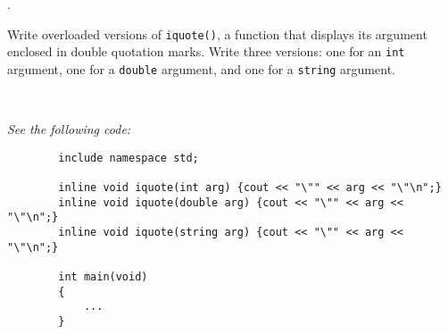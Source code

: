 \documentclass{amsart}
\begin{document}
. 
\begin{minipage}[t]{11.5 cm}
	Write overloaded versions of \texttt{iquote()}, a function that displays its argument enclosed in double quotation marks. Write three versions: one for an \texttt{int} argument, one for a \texttt{double} argument, and one for a \texttt{string} argument.
\end{minipage} \\[1ex]
\phantom{3. } 
\begin{minipage}[t]{11.5 cm}
	{\slshape See the following code:}
	\begin{verbatim}
		include namespace std;

		inline void iquote(int arg) {cout << "\"" << arg << "\"\n";}
		inline void iquote(double arg) {cout << "\"" << arg << "\"\n";}
		inline void iquote(string arg) {cout << "\"" << arg << "\"\n";}

		int main(void)
		{
		    ...
		}
	\end{verbatim} 
\end{minipage} 
\vfill
\newpage
\end{document}
